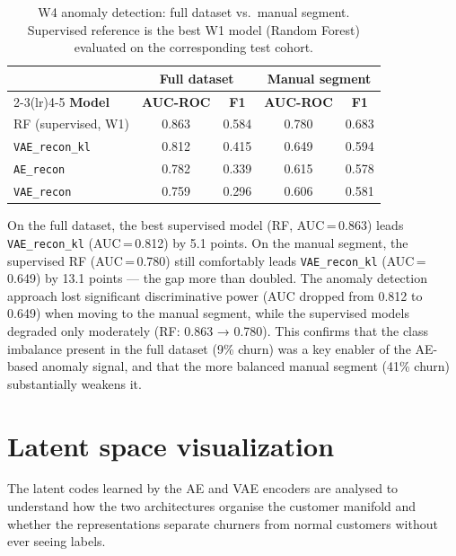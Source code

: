 \documentclass{article}
\begin{document}
\begin{table}[H]
    \centering
    \caption{W4 anomaly detection: full dataset vs.\ manual segment. Supervised
             reference is the best W1 model (Random Forest) evaluated on the
             corresponding test cohort.}
    \label{tab:full_vs_manual}
    \begin{tabular}{lcccc}
        \toprule
        & \multicolumn{2}{c}{\textbf{Full dataset}} & \multicolumn{2}{c}{\textbf{Manual segment}} \\
        \cmidrule(lr){2-3}\cmidrule(lr){4-5}
        \textbf{Model} & \textbf{AUC-ROC} & \textbf{F1} & \textbf{AUC-ROC} & \textbf{F1} \\
        \midrule
        RF (supervised, W1)   & 0.863 & 0.584 & 0.780 & 0.683 \\
        \midrule
        \texttt{VAE\_recon\_kl} & 0.812 & 0.415 & 0.649 & 0.594 \\
        \texttt{AE\_recon}      & 0.782 & 0.339 & 0.615 & 0.578 \\
        \texttt{VAE\_recon}     & 0.759 & 0.296 & 0.606 & 0.581 \\
        \bottomrule
    \end{tabular}
\end{table}

On the full dataset, the best supervised model (RF, AUC\,=\,0.863) leads
\texttt{VAE\_recon\_kl} (AUC\,=\,0.812) by 5.1 points. On the manual segment,
the supervised RF (AUC\,=\,0.780) still comfortably leads \texttt{VAE\_recon\_kl}
(AUC\,=\,0.649) by 13.1 points --- the gap more than doubled. The anomaly detection
approach lost significant discriminative power (AUC dropped from 0.812 to 0.649)
when moving to the manual segment, while the supervised models degraded only
moderately (RF: 0.863 → 0.780). This confirms that the class imbalance present
in the full dataset (9\% churn) was a key enabler of the AE-based anomaly signal,
and that the more balanced manual segment (41\% churn) substantially weakens it.

\section{Latent space visualization}

The latent codes learned by the AE and VAE encoders are analysed to understand how
the two architectures organise the customer manifold and whether the representations
separate churners from normal customers without ever seeing labels.
\end{document}
